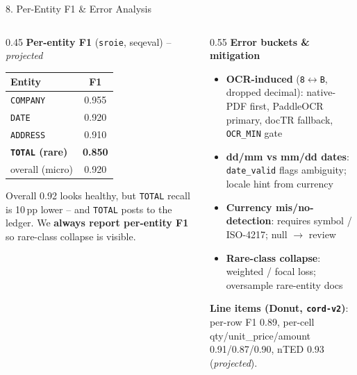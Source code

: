 \documentclass[10pt,aspectratio=169]{beamer}
\begin{document}
\begin{frame}{8. Per-Entity F1 \& Error Analysis}
\begin{columns}[T]
\begin{column}{0.45\textwidth}
\textbf{Per-entity F1} (\texttt{sroie}, seqeval) -- \emph{projected}
\begin{table}[h]
\centering\small
\begin{tabular}{lc}
\toprule
\textbf{Entity} & \textbf{F1} \\
\midrule
\texttt{COMPANY}   & 0.955 \\
\texttt{DATE}      & 0.920 \\
\texttt{ADDRESS}   & 0.910 \\
\textbf{\texttt{TOTAL} (rare)} & \textbf{0.850} \\
\midrule
overall (micro)    & 0.920 \\
\bottomrule
\end{tabular}
\end{table}
\scriptsize Overall 0.92 looks healthy, but \texttt{TOTAL} recall is 10\,pp lower -- and \texttt{TOTAL} posts to the ledger. We \textbf{always report per-entity F1} so rare-class collapse is visible.
\end{column}
\begin{column}{0.55\textwidth}
\textbf{Error buckets \& mitigation}
\begin{itemize}\scriptsize
  \item \textbf{OCR-induced} (\texttt{8$\leftrightarrow$B}, dropped decimal): native-PDF first, PaddleOCR primary, docTR fallback, \texttt{OCR\_MIN} gate
  \item \textbf{dd/mm vs mm/dd dates}: \texttt{date\_valid} flags ambiguity; locale hint from currency
  \item \textbf{Currency mis/no-detection}: requires symbol / ISO-4217; null $\to$ review
  \item \textbf{Rare-class collapse}: weighted / focal loss; oversample rare-entity docs
\end{itemize}

\vspace{0.1cm}
\textbf{Line items (Donut, \texttt{cord-v2})}: per-row F1 0.89, per-cell qty/unit\_price/amount 0.91/0.87/0.90, nTED 0.93 (\emph{projected}).
\end{column}
\end{columns}
\end{frame}
\end{document}
